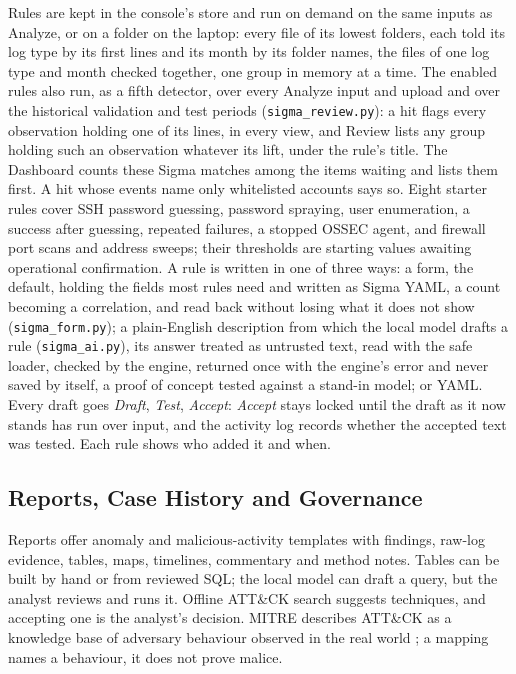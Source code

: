 \documentclass[11pt,a4paper]{article}
\newcommand{\tok}[1]{\texttt{\detokenize{#1}}}
\begin{document}
Rules are kept in the console's store and run on demand on the same inputs as Analyze, or on a folder on the laptop: every file of its lowest folders, each told its log type by its first lines and its month by its folder names, the files of one log type and month checked together, one group in memory at a time. The enabled rules also run, as a fifth detector, over every Analyze input and upload and over the historical validation and test periods (\nolinkurl{sigma_review.py}): a hit flags every observation holding one of its lines, in every view, and Review lists any group holding such an observation whatever its lift, under the rule's title. The Dashboard counts these Sigma matches among the items waiting and lists them first. A hit whose events name only whitelisted accounts says so. Eight starter rules cover SSH password guessing, password spraying, user enumeration, a success after guessing, repeated \tok{su} failures, a stopped OSSEC agent, and firewall port scans and address sweeps; their thresholds are starting values awaiting operational confirmation. A rule is written in one of three ways: a form, the default, holding the fields most rules need and written as Sigma YAML, a count becoming a correlation, and read back without losing what it does not show (\nolinkurl{sigma_form.py}); a plain-English description from which the local model drafts a rule (\nolinkurl{sigma_ai.py}), its answer treated as untrusted text, read with the safe loader, checked by the engine, returned once with the engine's error and never saved by itself, a proof of concept tested against a stand-in model; or YAML. Every draft goes \emph{Draft}, \emph{Test}, \emph{Accept}: \emph{Accept} stays locked until the draft as it now stands has run over input, and the activity log records whether the accepted text was tested. Each rule shows who added it and when.

\subsection{Reports, Case History and Governance}\label{sec:reports}

Reports offer anomaly and malicious-activity templates with findings, raw-log evidence, tables, maps, timelines, commentary and method notes. Tables can be built by hand or from reviewed SQL; the local model can draft a query, but the analyst reviews and runs it. Offline ATT\&CK search suggests techniques, and accepting one is the analyst's decision. MITRE describes ATT\&CK as a knowledge base of adversary behaviour observed in the real world \cite{ref10}; a mapping names a behaviour, it does not prove malice.
\end{document}
